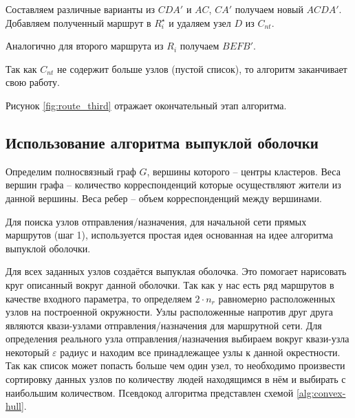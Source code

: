 Составляем различные варианты из \( CDA' \) и \( AC \), \( CA' \) получаем новый \( ACDA' \). Добавляем 
полученный маршрут в \( R^{\star}_i \) и удаляем узел \( D \) из \( C_{nt} \).

Аналогично для второго маршрута из \( R_i \) получаем \( BEFB' \).

Так как \( C_{nt} \) не содержит больше узлов (пустой список), то алгоритм заканчивает свою работу.

Рисунок \ref{fig:route_third} отражает окончательный этап алгоритма.

\subsection{Использование алгоритма выпуклой оболочки}
Определим полносвязный граф \( G \), вершины которого -- центры кластеров. Веса вершин графа -- количество 
корреспонденций которые осуществляют жители из данной вершины. Веса ребер -- объем корреспонденций между 
вершинами.

Для поиска узлов отправления/назначения, для начальной сети прямых маршрутов (шаг 1), используется простая 
идея основанная на идее алгоритма выпуклой оболочки.

Для всех заданных узлов создаётся выпуклая оболочка. Это помогает нарисовать круг описанный вокруг данной
оболочки. Так как у нас есть ряд маршрутов в качестве входного параметра, то определяем \( 2\cdot n_r \) 
равномерно расположенных узлов на построенной окружности. Узлы расположенные напротив друг друга являются 
квази-узлами отправления/назначения для маршрутной сети. Для определения реального узла отправления/назначения 
выбираем вокруг квази-узла некоторый \( \varepsilon \) радиус и находим все принадлежащее узлы к данной 
окрестности. Так как список может попасть больше чем один узел, то необходимо произвести сортировку данных 
узлов по количеству людей находящимся в нём и выбирать с наибольшим количеством. Псевдокод алгоритма 
представлен схемой \ref{alg:convex-hull}.

